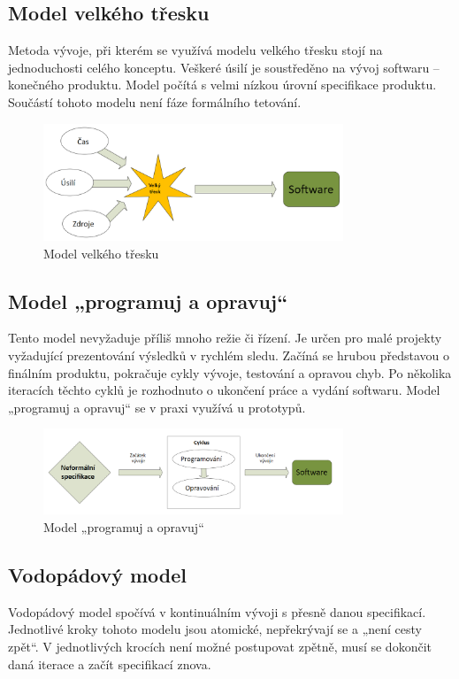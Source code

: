 \subsection{Model velkého třesku}
Metoda vývoje, při kterém se využívá modelu velkého třesku stojí na jednoduchosti celého konceptu. Veškeré úsilí je soustředěno na vývoj softwaru – konečného produktu. Model počítá s velmi nízkou úrovní specifikace produktu. Součástí tohoto modelu není fáze formálního tetování.\cite{Patton2002}


\begin{figure}[h]
	\centering
	\includegraphics[width=0.8\textwidth]{Figures/velky-tresk.png}
	\caption{Model velkého třesku}
	\label{fig:WritingThesis}
\end{figure}

\subsection{Model „programuj a opravuj“}
Tento model nevyžaduje příliš mnoho režie či řízení. Je určen pro malé projekty vyžadující prezentování výsledků v rychlém sledu. Začíná se hrubou představou o finálním produktu, pokračuje cykly vývoje, testování a opravou chyb. Po několika iteracích těchto cyklů je rozhodnuto o ukončení práce a vydání softwaru. Model „programuj a opravuj“ se v praxi využívá u prototypů.\cite{Patton2002}


\begin{figure}[h]
	\centering
	\includegraphics[width=0.8\textwidth]{Figures/programuj-a-opravuj.png}
	\caption{Model „programuj a opravuj“}
	\label{fig:WritingThesis}
\end{figure}

\subsection{Vodopádový model}
Vodopádový model spočívá v kontinuálním vývoji s přesně danou specifikací. Jednotlivé kroky tohoto modelu jsou atomické, nepřekrývají se a „není cesty zpět“. V jednotlivých krocích není možné postupovat zpětně, musí se dokončit daná iterace a začít specifikací znova.\cite{Patton2002}

